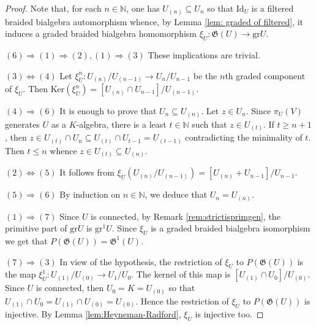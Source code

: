 \documentclass[english]{amsart}
\numberwithin{equation}{section}
\numberwithin{figure}{section}
\theoremstyle{plain}
\theoremstyle{definition}
\theoremstyle{definition}
\theoremstyle{remark}
\theoremstyle{remark}
\theoremstyle{plain}
\theoremstyle{plain}
\theoremstyle{plain}
\begin{document}
\begin{proof}
Note that, for each $n\in\mathbb{N}$, one has $U_{\left(n\right)}\subseteq U_{n}$
so that $\mathrm{Id}_{U}$ is a filtered braided bialgebra automorphism
whence, by Lemma \ref{lem: graded of filtered}, it induces a graded
braided bialgebra homomorphism $\xi_{U}:\mathfrak{G}\left(U\right)\rightarrow\mathrm{gr}U.$ 

$\left(6\right)\Rightarrow\left(1\right)\Rightarrow\left(2\right),\left(1\right)\Rightarrow\left(3\right)$
These implications are trivial.

$\left(3\right)\Leftrightarrow\left(4\right)$ Let $\xi_{U}^{n}:U_{\left(n\right)}/U_{\left(n-1\right)}\rightarrow U_{n}/U_{n-1}$
be the $n$th graded component of $\xi_{U}$. Then $\mathrm{Ker}\left(\xi_{U}^{n}\right)=\left[U_{\left(n\right)}\cap U_{n-1}\right]/U_{\left(n-1\right)}$. 

$\left(4\right)\Rightarrow\left(6\right)$ It is enough to prove that
$U_{n}\subseteq U_{\left(n\right)}$. Let $z\in U_{n}$. Since $\pi_U\left(V\right)$
generates $U$ as a $K$-algebra, there is a least $t\in\mathbb{N}$
such that $z\in U_{\left(t\right)}$. If $t\geq n+1$, then $z\in U_{\left(t\right)}\cap U_{n}\subseteq U_{\left(t\right)}\cap U_{t-1}=U_{\left(t-1\right)}$
contradicting the minimality of $t$. Then $t\leq n$ whence $z\in U_{\left(t\right)}\subseteq U_{\left(n\right)}$. 

$\left(2\right)\Leftrightarrow\left(5\right)$ It follows from $\xi_{U}\left(U_{\left(n\right)}/U_{\left(n-1\right)}\right)=\left[U_{\left(n\right)}+U_{n-1}\right]/U_{n-1}$.

$\left(5\right)\Rightarrow\left(6\right)$ By induction on $n\in\mathbb{N}$,
we deduce that $U_{n}=U_{\left(n\right)}$.

$\left(1\right)\Rightarrow\left(7\right)$ Since $U$ is connected,
by Remark \ref{rem:strictisprimgen}, the primitive
part of $\mathrm{gr}U$ is $\mathrm{gr}^{1}U$. Since $\xi_{U}$ is
a graded braided bialgebra isomorphism we get that $P\left(\mathfrak{G}\left(U\right)\right)=\mathfrak{G}^{1}\left(U\right).$

$\left(7\right)\Rightarrow\left(3\right)$ In view of the hypothesis,
the restriction of $\xi_{U}$ to $P\left(\mathfrak{G}\left(U\right)\right)$
is the map $\xi_{U}^{1}:U_{\left(1\right)}/U_{\left(0\right)}\rightarrow U_{1}/U_{0}.$
The kernel of this map is $\left[U_{\left(1\right)}\cap U_{0}\right]/U_{\left(0\right)}$.
Since $U$ is connected, then $U_{0}=K=U_{\left(0\right)}$ so that
$U_{\left(1\right)}\cap U_{0}=U_{\left(1\right)}\cap U_{\left(0\right)}=U_{\left(0\right)}$.
Hence the restriction of $\xi_{U}$ to $P\left(\mathfrak{G}\left(U\right)\right)$
is injective. By Lemma \ref{lem:Heyneman-Radford}, $\xi_{U}$ is injective
too.


\end{proof}
\end{document}
